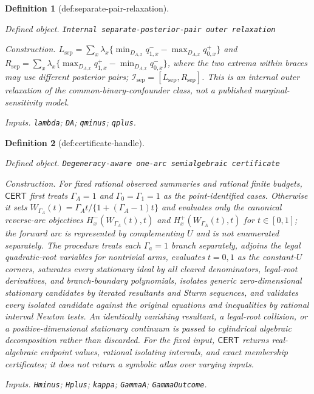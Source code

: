 \documentclass{article}
\newtheorem{definition}{Definition}
\begin{document}
\begin{definition}[def:separate-pair-relaxation]\label{def:separate-pair-relaxation}
\par\smallskip\noindent\emph{Defined object.} \texttt{Internal separate-\allowbreak{}posterior-\allowbreak{}pair outer relaxation}
\par\smallskip\noindent\emph{Construction.} \(L_{\mathrm{sep}}=\sum_x\lambda_x\{\min_{D_{A,x}}q^-_{1,x}-\max_{D_{A,x}}q^+_{0,x}\}\) and \(R_{\mathrm{sep}}=\sum_x\lambda_x\{\max_{D_{A,x}}q^+_{1,x}-\min_{D_{A,x}}q^-_{0,x}\}\), where the two extrema within braces may use different posterior pairs; \(\mathcal I_{\mathrm{sep}}=[L_{\mathrm{sep}},R_{\mathrm{sep}}]\).  This is an internal outer relaxation of the common-binary-confounder class, not a published marginal-sensitivity model.
\par\smallskip\noindent\emph{Inputs.} \texttt{lambda}; \texttt{DA}; \texttt{qminus}; \texttt{qplus}.
\end{definition}

\begin{definition}[def:certificate-handle]\label{def:certificate-handle}
\par\smallskip\noindent\emph{Defined object.} \texttt{Degeneracy-\allowbreak{}aware one-\allowbreak{}arc semialgebraic certificate}
\par\smallskip\noindent\emph{Construction.} For fixed rational observed summaries and rational finite budgets, \(\mathsf{CERT}\) first treats \(\Gamma_A=1\) and \(\Gamma_0=\Gamma_1=1\) as the point-identified cases.  Otherwise it sets \(W_{\Gamma_A}(t)=\Gamma_A t/\{1+(\Gamma_A-1)t\}\) and evaluates only the canonical reverse-arc objectives \(H_x^-(W_{\Gamma_A}(t),t)\) and \(H_x^+(W_{\Gamma_A}(t),t)\) for \(t\in[0,1]\); the forward arc is represented by complementing \(U\) and is not enumerated separately.  The procedure treats each \(\Gamma_a=1\) branch separately, adjoins the legal quadratic-root variables for nontrivial arms, evaluates \(t=0,1\) as the constant-\(U\) corners, saturates every stationary ideal by all cleared denominators, legal-root derivatives, and branch-boundary polynomials, isolates generic zero-dimensional stationary candidates by iterated resultants and Sturm sequences, and validates every isolated candidate against the original equations and inequalities by rational interval Newton tests.  An identically vanishing resultant, a legal-root collision, or a positive-dimensional stationary continuum is passed to cylindrical algebraic decomposition rather than discarded.  For the fixed input, \(\mathsf{CERT}\) returns real-algebraic endpoint values, rational isolating intervals, and exact membership certificates; it does not return a symbolic atlas over varying inputs.
\par\smallskip\noindent\emph{Inputs.} \texttt{Hminus}; \texttt{Hplus}; \texttt{kappa}; \texttt{GammaA}; \texttt{GammaOutcome}.
\end{definition}
\end{document}
